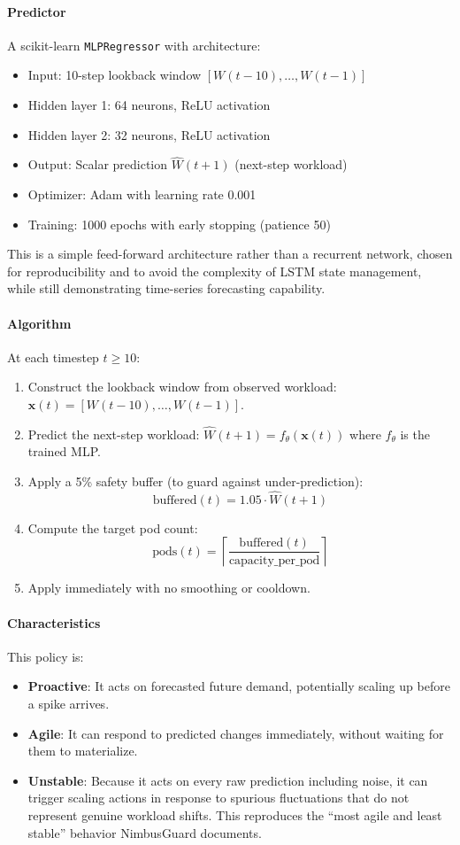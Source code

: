 \paragraph{Predictor} A scikit-learn \texttt{MLPRegressor} with architecture:
\begin{itemize}
  \item Input: 10-step lookback window $[W(t-10), \ldots, W(t-1)]$
  \item Hidden layer 1: 64 neurons, ReLU activation
  \item Hidden layer 2: 32 neurons, ReLU activation
  \item Output: Scalar prediction $\hat{W}(t+1)$ (next-step workload)
  \item Optimizer: Adam with learning rate 0.001
  \item Training: 1000 epochs with early stopping (patience 50)
\end{itemize}

This is a simple feed-forward architecture rather than a recurrent network, chosen for reproducibility and to avoid the complexity of LSTM state management, while still demonstrating time-series forecasting capability.

\paragraph{Algorithm} At each timestep $t \geq 10$:
\begin{enumerate}
  \item Construct the lookback window from observed workload: $\mathbf{x}(t) = [W(t-10), \ldots, W(t-1)]$.
  \item Predict the next-step workload: $\hat{W}(t+1) = f_{\theta}(\mathbf{x}(t))$ where $f_{\theta}$ is the trained MLP.
  \item Apply a 5\% safety buffer (to guard against under-prediction):
  \[
  \text{buffered}(t) = 1.05 \cdot \hat{W}(t+1)
  \]
  \item Compute the target pod count:
  \[
  \text{pods}(t) = \left\lceil \frac{\text{buffered}(t)}{\text{capacity\_per\_pod}} \right\rceil
  \]
  \item Apply immediately with no smoothing or cooldown.
\end{enumerate}

\paragraph{Characteristics} This policy is:
\begin{itemize}
  \item \textbf{Proactive}: It acts on forecasted future demand, potentially scaling up before a spike arrives.
  \item \textbf{Agile}: It can respond to predicted changes immediately, without waiting for them to materialize.
  \item \textbf{Unstable}: Because it acts on every raw prediction including noise, it can trigger scaling actions in response to spurious fluctuations that do not represent genuine workload shifts. This reproduces the ``most agile and least stable'' behavior NimbusGuard documents.
\end{itemize}


